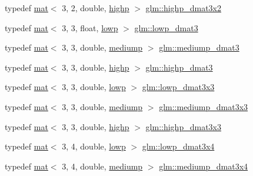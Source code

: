 \begin{DoxyCompactItemize}
\item 
typedef \hyperlink{structglm_1_1mat}{mat}$<$ 3, 2, double, \hyperlink{namespaceglm_a36ed105b07c7746804d7fdc7cc90ff25ac6f7eab42eacbb10d59a58e95e362074}{highp} $>$ \hyperlink{group__core__precision_ga8454b92a3917b17a8663f2409cb3100d}{glm\+::highp\+\_\+dmat3x2}
\item 
typedef \hyperlink{structglm_1_1mat}{mat}$<$ 3, 3, float, \hyperlink{namespaceglm_a36ed105b07c7746804d7fdc7cc90ff25ae161af3fc695e696ce3bf69f7332bc2d}{lowp} $>$ \hyperlink{group__core__precision_ga2e700c380867b8d935f2c9ea40c9ca16}{glm\+::lowp\+\_\+dmat3}
\item 
typedef \hyperlink{structglm_1_1mat}{mat}$<$ 3, 3, double, \hyperlink{namespaceglm_a36ed105b07c7746804d7fdc7cc90ff25a6416f3ea0c9025fb21ed50c4d6620482}{mediump} $>$ \hyperlink{group__core__precision_gaf1be0a781d33d2450a31e64e09d8d18f}{glm\+::mediump\+\_\+dmat3}
\item 
typedef \hyperlink{structglm_1_1mat}{mat}$<$ 3, 3, double, \hyperlink{namespaceglm_a36ed105b07c7746804d7fdc7cc90ff25ac6f7eab42eacbb10d59a58e95e362074}{highp} $>$ \hyperlink{group__core__precision_ga2e305d56d01a4553a7fd2b6d2c580fa0}{glm\+::highp\+\_\+dmat3}
\item 
typedef \hyperlink{structglm_1_1mat}{mat}$<$ 3, 3, double, \hyperlink{namespaceglm_a36ed105b07c7746804d7fdc7cc90ff25ae161af3fc695e696ce3bf69f7332bc2d}{lowp} $>$ \hyperlink{group__core__precision_gacc5689588709eb4ccf582f21cd9af38c}{glm\+::lowp\+\_\+dmat3x3}
\item 
typedef \hyperlink{structglm_1_1mat}{mat}$<$ 3, 3, double, \hyperlink{namespaceglm_a36ed105b07c7746804d7fdc7cc90ff25a6416f3ea0c9025fb21ed50c4d6620482}{mediump} $>$ \hyperlink{group__core__precision_ga8ecaed5443b0aa73bbe8683fcbb04f65}{glm\+::mediump\+\_\+dmat3x3}
\item 
typedef \hyperlink{structglm_1_1mat}{mat}$<$ 3, 3, double, \hyperlink{namespaceglm_a36ed105b07c7746804d7fdc7cc90ff25ac6f7eab42eacbb10d59a58e95e362074}{highp} $>$ \hyperlink{group__core__precision_gae5f677e4437523476511c84a17206ac2}{glm\+::highp\+\_\+dmat3x3}
\item 
typedef \hyperlink{structglm_1_1mat}{mat}$<$ 3, 4, double, \hyperlink{namespaceglm_a36ed105b07c7746804d7fdc7cc90ff25ae161af3fc695e696ce3bf69f7332bc2d}{lowp} $>$ \hyperlink{group__core__precision_ga5a806e50b4cb26784620e98c8c03f03b}{glm\+::lowp\+\_\+dmat3x4}
\item 
typedef \hyperlink{structglm_1_1mat}{mat}$<$ 3, 4, double, \hyperlink{namespaceglm_a36ed105b07c7746804d7fdc7cc90ff25a6416f3ea0c9025fb21ed50c4d6620482}{mediump} $>$ \hyperlink{group__core__precision_ga8e38f500f63f5caed06699264acfb456}{glm\+::mediump\+\_\+dmat3x4}

\end{DoxyCompactItemize}
